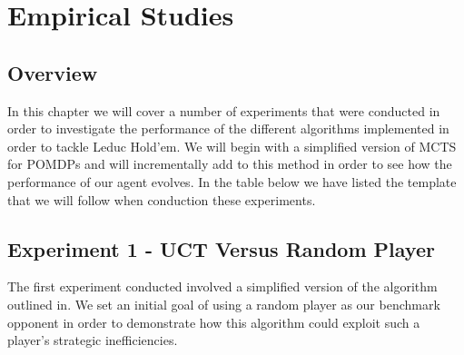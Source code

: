 
\chapter{Empirical Studies}\label{ch:empirical}

\section{Overview}\label{sec:empOverview}
In this chapter we will cover a number of experiments that were conducted in order to investigate
the performance of the different algorithms implemented in order to tackle Leduc Hold'em.
We will begin with a simplified version of MCTS for POMDPs and will incrementally add to this
method in order to see how the performance of our agent evolves.
In the table below we have listed the template that we will follow when conduction these experiments.



\section{Experiment 1 - UCT Versus Random Player}\label{sec:expmeriment1}
The first experiment conducted involved a simplified version of the algorithm outlined in\citep{silver2010monte}.
We set an initial goal of using a random player as our benchmark opponent in order to demonstrate how
this algorithm could exploit such a player's strategic inefficiencies.

